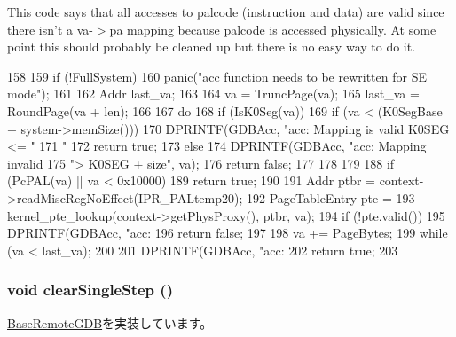This code says that all accesses to palcode (instruction and data) are valid since there isn't a va-\/$>$pa mapping because palcode is accessed physically. At some point this should probably be cleaned up but there is no easy way to do it.


\begin{DoxyCode}
158 {
159     if (!FullSystem)
160         panic("acc function needs to be rewritten for SE mode\n");
161 
162     Addr last_va;
163 
164     va = TruncPage(va);
165     last_va = RoundPage(va + len);
166 
167     do  {
168         if (IsK0Seg(va)) {
169             if (va < (K0SegBase + system->memSize())) {
170                 DPRINTF(GDBAcc, "acc:   Mapping is valid  K0SEG <= "
171                         "%
172                 return true;
173             } else {
174                 DPRINTF(GDBAcc, "acc:   Mapping invalid %
175                         "> K0SEG + size\n", va);
176                 return false;
177             }
178         }
179 
188         if (PcPAL(va) || va < 0x10000)
189             return true;
190 
191         Addr ptbr = context->readMiscRegNoEffect(IPR_PALtemp20);
192         PageTableEntry pte =
193             kernel_pte_lookup(context->getPhysProxy(), ptbr, va);
194         if (!pte.valid()) {
195             DPRINTF(GDBAcc, "acc:   %
196             return false;
197         }
198         va += PageBytes;
199     } while (va < last_va);
200 
201     DPRINTF(GDBAcc, "acc:   %
202     return true;
203 }
\end{DoxyCode}
\hypertarget{classAlphaISA_1_1RemoteGDB_afd89268069d9026378b06b08c97f65f8}{
\subsubsection[{clearSingleStep}]{\setlength{\rightskip}{0pt plus 5cm}void clearSingleStep ()}}
\label{classAlphaISA_1_1RemoteGDB_afd89268069d9026378b06b08c97f65f8}


\hyperlink{classBaseRemoteGDB_a69f1887d1310ab6f19cf5bbcdf9d7a1e}{BaseRemoteGDB}を実装しています。


